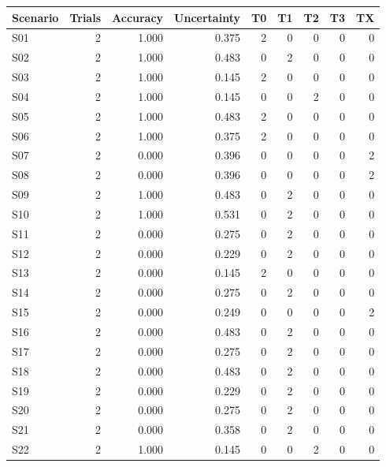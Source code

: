 \begin{tabular}{lrrrrrrrr}
\toprule
Scenario & Trials & Accuracy & Uncertainty & T0 & T1 & T2 & T3 & TX \\
\midrule
S01 & 2 & 1.000 & 0.375 & 2 & 0 & 0 & 0 & 0 \\
S02 & 2 & 1.000 & 0.483 & 0 & 2 & 0 & 0 & 0 \\
S03 & 2 & 1.000 & 0.145 & 2 & 0 & 0 & 0 & 0 \\
S04 & 2 & 1.000 & 0.145 & 0 & 0 & 2 & 0 & 0 \\
S05 & 2 & 1.000 & 0.483 & 2 & 0 & 0 & 0 & 0 \\
S06 & 2 & 1.000 & 0.375 & 2 & 0 & 0 & 0 & 0 \\
S07 & 2 & 0.000 & 0.396 & 0 & 0 & 0 & 0 & 2 \\
S08 & 2 & 0.000 & 0.396 & 0 & 0 & 0 & 0 & 2 \\
S09 & 2 & 1.000 & 0.483 & 0 & 2 & 0 & 0 & 0 \\
S10 & 2 & 1.000 & 0.531 & 0 & 2 & 0 & 0 & 0 \\
S11 & 2 & 0.000 & 0.275 & 0 & 2 & 0 & 0 & 0 \\
S12 & 2 & 0.000 & 0.229 & 0 & 2 & 0 & 0 & 0 \\
S13 & 2 & 0.000 & 0.145 & 2 & 0 & 0 & 0 & 0 \\
S14 & 2 & 0.000 & 0.275 & 0 & 2 & 0 & 0 & 0 \\
S15 & 2 & 0.000 & 0.249 & 0 & 0 & 0 & 0 & 2 \\
S16 & 2 & 0.000 & 0.483 & 0 & 2 & 0 & 0 & 0 \\
S17 & 2 & 0.000 & 0.275 & 0 & 2 & 0 & 0 & 0 \\
S18 & 2 & 0.000 & 0.483 & 0 & 2 & 0 & 0 & 0 \\
S19 & 2 & 0.000 & 0.229 & 0 & 2 & 0 & 0 & 0 \\
S20 & 2 & 0.000 & 0.275 & 0 & 2 & 0 & 0 & 0 \\
S21 & 2 & 0.000 & 0.358 & 0 & 2 & 0 & 0 & 0 \\
S22 & 2 & 1.000 & 0.145 & 0 & 0 & 2 & 0 & 0 \\
\bottomrule
\end{tabular}
